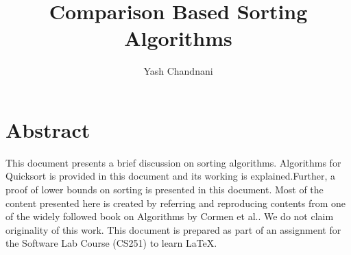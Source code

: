 \documentclass[12pt,twocolumn]{article}
\title{Comparison Based Sorting Algorithms}
\author{Yash Chandnani}
\date{}
\begin{document}
\maketitle 
\section*{Abstract}
This document presents a brief discussion on sorting algorithms. Algorithms for Quicksort is provided in this document and its working is explained.Further, a proof of lower bounds on sorting is presented in this document. Most of the content presented here is created by referring and reproducing contents from one of the widely followed book on Algorithms by Cormen et al.\cite{1}. We do not claim originality of this work. This document is prepared as part of an assignment for the Software Lab Course (CS251) to learn \LaTeX.\\
\\
\end{document}

